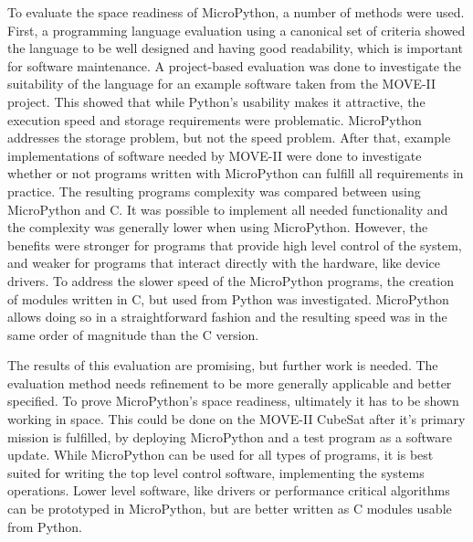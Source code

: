 To evaluate the space readiness of MicroPython, a number of methods were used. First, a programming language evaluation using a canonical set of criteria showed the language to be well designed and having good readability, which is important for software maintenance. A project-based evaluation was done to investigate the suitability of the language for an example software taken from the MOVE-II project. This showed that while Python's usability makes it attractive, the execution speed and storage requirements were problematic. MicroPython addresses the storage problem, but not the speed problem. After that, example implementations of software needed by MOVE-II were done to investigate whether or not programs written with MicroPython can fulfill all requirements in practice. The resulting programs complexity was compared between using MicroPython and C. It was possible to implement all needed functionality and the complexity was generally lower when using MicroPython. However, the benefits were stronger for programs that provide high level control of the system, and weaker for programs that interact directly with the hardware, like device drivers. To address the slower speed of the MicroPython programs, the creation of modules written in C, but used from Python was investigated. MicroPython allows doing so in a straightforward fashion and the resulting speed was in the same order of magnitude than the C version.

The results of this evaluation are promising, but further work is needed. The evaluation method needs refinement to be more generally applicable and better specified. To prove MicroPython's space readiness, ultimately it has to be shown working in space. This could be done on the MOVE-II CubeSat after it's primary mission is fulfilled, by deploying MicroPython and a test program as a software update. While MicroPython can be used for all types of programs, it is best suited for writing the top level control software, implementing the systems operations. Lower level software, like drivers or performance critical algorithms can be prototyped in MicroPython, but are better written as C modules usable from Python.

